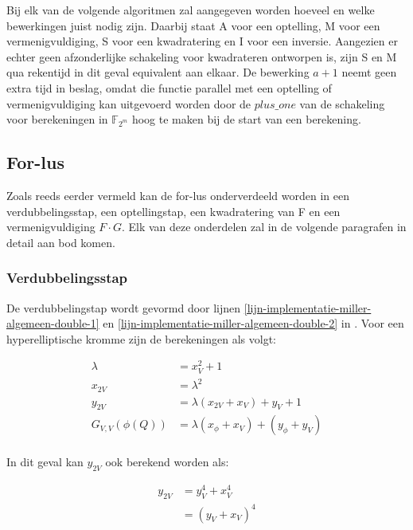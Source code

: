 Bij elk van de volgende algoritmen zal aangegeven worden hoeveel en welke bewerkingen juist nodig zijn. Daarbij staat \textsf{A} voor een optelling, \textsf{M} voor een vermenigvuldiging, \textsf{S} voor een kwadratering en \textsf{I} voor een inversie. Aangezien er echter geen afzonderlijke schakeling voor kwadrateren ontworpen is, zijn \textsf{S} en \textsf{M} qua rekentijd in dit geval equivalent aan elkaar. De bewerking $a + 1$ neemt geen extra tijd in beslag, omdat die functie parallel met een optelling of vermenigvuldiging kan uitgevoerd worden door de $plus\_one$ van de schakeling voor berekeningen in $\mathbb{F}_{2^m}$ hoog te maken bij de start van een berekening.

\subsection{For-lus}\label{subsectie-implementatie-miller-forlus}

Zoals reeds eerder vermeld kan de for-lus onderverdeeld worden in een verdubbelingsstap, een optellingstap, een kwadratering van F en een vermenigvuldiging $F \cdot G$. Elk van deze onderdelen zal in de volgende paragrafen in detail aan bod komen.

\subsubsection{Verdubbelingsstap}

De verdubbelingstap wordt gevormd door lijnen \ref{lijn-implementatie-miller-algemeen-double-1} en \ref{lijn-implementatie-miller-algemeen-double-2} in . Voor een hyperelliptische kromme zijn de berekeningen als volgt\cite{bertoni}:

\[\begin{aligned}
	\lambda &= x_V^2 + 1\\
	x_{2V} &= \lambda ^2\\
	y_{2V} &= \lambda (x_{2V} + x_V) + y_V + 1\\
	G_{V,V}(\phi(Q)) &= \lambda (x_{\phi} + x_V) + (y_{\phi} + y_V)\\
\end{aligned}\]

In dit geval kan $y_{2V}$ ook berekend worden als:

\[\begin{aligned}
y_{2V}	&= y_V^4 + x_V^4\\
			&= (y_V + x_V)^4\\	
\end{aligned}\]

